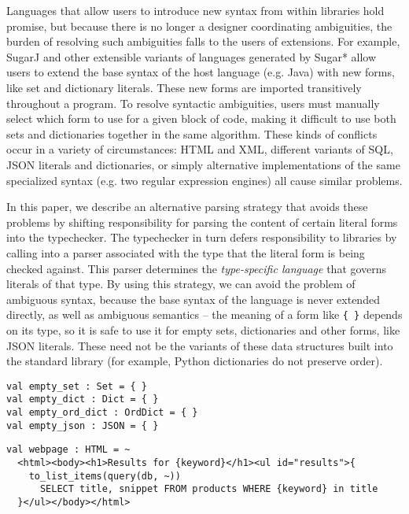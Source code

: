 Languages that allow users to introduce new syntax from within libraries hold promise, but because there is no longer a designer coordinating ambiguities, the burden of resolving such ambiguities falls to the users of extensions. For example, SugarJ \cite{sugarj} and other extensible variants of languages generated by Sugar* \cite{sugarstar} allow users to extend the base syntax of the host language (e.g. Java) with new forms, like set and dictionary literals. These new forms are imported transitively throughout a program. To resolve syntactic ambiguities, users must manually select which form to use for a given block of code, making it difficult to use both sets and dictionaries together in the same algorithm.  These kinds of conflicts occur in a variety of circumstances: HTML and XML, different variants of SQL, JSON literals and dictionaries, or simply alternative implementations of the same specialized syntax (e.g. two regular expression engines) all cause similar problems.

In this paper, we describe an alternative parsing strategy that avoids these problems by shifting responsibility for parsing the content of certain literal forms into the typechecker. The typechecker in turn defers responsibility to libraries by calling into a parser associated with the type that the literal form is being checked against. This parser determines the \emph{type-specific language} that governs literals of that type. By using this strategy, we can avoid the problem of ambiguous syntax, because the base syntax of the language is never extended directly, as well as ambiguous semantics -- the meaning of a form like \verb|{ }| depends on its type, so it is safe to use it for empty sets, dictionaries and other forms, like JSON literals. These need not be the variants of these data structures built into the standard library (for example, Python dictionaries do not preserve order).
\begin{lstlisting}
val empty_set : Set = { }
val empty_dict : Dict = { }
val empty_ord_dict : OrdDict = { }
val empty_json : JSON = { }
\end{lstlisting}

\begin{lstlisting}
val webpage : HTML = ~
  <html><body><h1>Results for {keyword}</h1><ul id="results">{
  	to_list_items(query(db, ~))
      SELECT title, snippet FROM products WHERE {keyword} in title
  }</ul></body></html>
\end{lstlisting}

